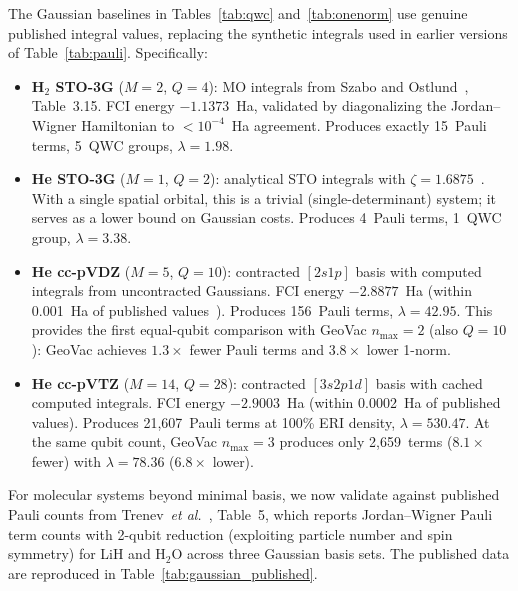 \documentclass[aps,pra,twocolumn,superscriptaddress,longbibliography]{revtex4-2}
\begin{document}
The Gaussian baselines in Tables~\ref{tab:qwc} and~\ref{tab:onenorm}
use genuine published integral values, replacing the synthetic
integrals used in earlier versions of Table~\ref{tab:pauli}.
Specifically:
\begin{itemize}
\item \textbf{H$_2$ STO-3G} ($M = 2$, $Q = 4$): MO integrals from
  Szabo and Ostlund~\cite{szabo1996}, Table~3.15.  FCI energy
  $-1.1373$~Ha, validated by diagonalizing the Jordan--Wigner
  Hamiltonian to $< 10^{-4}$~Ha agreement.  Produces exactly 15~Pauli
  terms, 5~QWC groups, $\lambda = 1.98$.
\item \textbf{He STO-3G} ($M = 1$, $Q = 2$): analytical STO integrals
  with $\zeta = 1.6875$~\cite{hehre1969}.  With a single spatial
  orbital, this is a trivial (single-determinant) system; it serves
  as a lower bound on Gaussian costs.  Produces 4~Pauli terms,
  1~QWC group, $\lambda = 3.38$.
\item \textbf{He cc-pVDZ} ($M = 5$, $Q = 10$): contracted $[2s1p]$
  basis with computed integrals from uncontracted Gaussians.  FCI
  energy $-2.8877$~Ha (within 0.001~Ha of published
  values~\cite{nist_he}).  Produces 156~Pauli terms,
  $\lambda = 42.95$.  This provides the first equal-qubit comparison
  with GeoVac $n_{\max} = 2$ (also $Q = 10$): GeoVac achieves
  $1.3\times$ fewer Pauli terms and $3.8\times$ lower 1-norm.
\item \textbf{He cc-pVTZ} ($M = 14$, $Q = 28$): contracted
  $[3s2p1d]$ basis with cached computed integrals.  FCI energy
  $-2.9003$~Ha (within 0.0002~Ha of published values).  Produces
  21{,}607~Pauli terms at 100\% ERI density, $\lambda = 530.47$.
  At the same qubit count, GeoVac $n_{\max} = 3$ produces only
  2{,}659~terms ($8.1\times$ fewer) with $\lambda = 78.36$
  ($6.8\times$ lower).
\end{itemize}

For molecular systems beyond minimal basis, we now validate against
published Pauli counts from Trenev~\textit{et al.}~\cite{trenev2025},
Table~5, which reports Jordan--Wigner Pauli term counts with 2-qubit
reduction (exploiting particle number and spin symmetry) for LiH and
H$_2$O across three Gaussian basis sets.  The published data are
reproduced in Table~\ref{tab:gaussian_published}.
\end{document}
